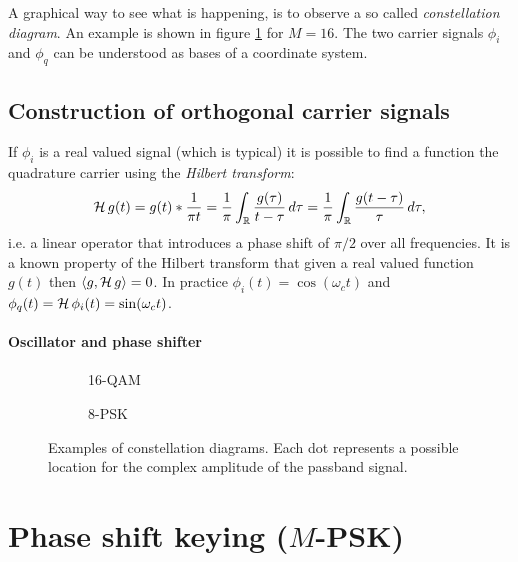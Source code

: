 A graphical way to see what is happening, is to observe a so called \emph{constellation diagram}. An example is shown in figure \ref{fig:qam-constellation} for \(M = 16\). The two carrier signals \(\phi_i\) and \(\phi_q\) can be understood as bases of a coordinate system.

\subsection{Construction of orthogonal carrier signals}


If \(\phi_i\) is a real valued signal (which is typical) it is possible to find a function the quadrature carrier using the \emph{Hilbert transform}:
\begin{equation}
	\operatorname{\mathcal{H}} g(t) = g(t) * \frac{1}{\pi t}
		= \frac{1}{\pi} \int_\mathbb{R} \frac{g(\tau)}{t - \tau} \,d\tau
		= \frac{1}{\pi} \int_\mathbb{R} \frac{g(t - \tau)}{\tau} \,d\tau,
\end{equation}
i.e. a linear operator that introduces a phase shift of \(\pi / 2\) over all frequencies. It is a known property of the Hilbert transform that given a real valued function \(g(t)\) then \(\langle g, \operatorname{\mathcal{H}} g \rangle = 0\).
In practice \(\phi_i(t) = \cos(\omega_c t)\) and \(\phi_q(t) = \operatorname{\mathcal{H}} \phi_i(t) = \sin(\omega_c t)\).  

\paragraph{Oscillator and phase shifter}

\begin{figure}
	\hfill
	\begin{subfigure}{.4\linewidth}
		
		\caption{16-QAM\label{fig:qam-constellation}}
	\end{subfigure}
	\hfill
	\begin{subfigure}{.4\linewidth}
		
		\caption{8-PSK\label{fig:psk-constellation}}
	\end{subfigure}
	\hfill
	\caption{
		Examples of constellation diagrams. Each dot represents a possible location for the complex amplitude of the passband signal.
	}
\end{figure}


\section{Phase shift keying (\(M\)-PSK)}

